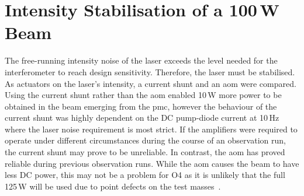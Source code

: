 \section{Intensity Stabilisation of a 100\,W Beam}
The free-running intensity noise of the laser exceeds the level needed for the interferometer to reach design sensitivity. Therefore, the laser must be stabilised. As actuators on the laser's intensity, a current shunt and an \gls{aom} were compared. Using the current shunt rather than the \gls{aom} enabled 10\,W more power to be obtained in the beam emerging from the \gls{pmc}, however the behaviour of the current shunt was highly dependent on the DC pump-diode current at 10\,Hz where the laser noise requirement is most strict. If the amplifiers were required to operate under different circumstances during the course of an observation run, the current shunt may prove to be unreliable. In contrast, the \gls{aom} has proved reliable during previous observation runs. While the \gls{aom} causes the beam to have less DC power, this may not be a problem for O4 as it is unlikely that the full 125\,W will be used due to point defects on the test masses~\cite{Buikema2020}.
